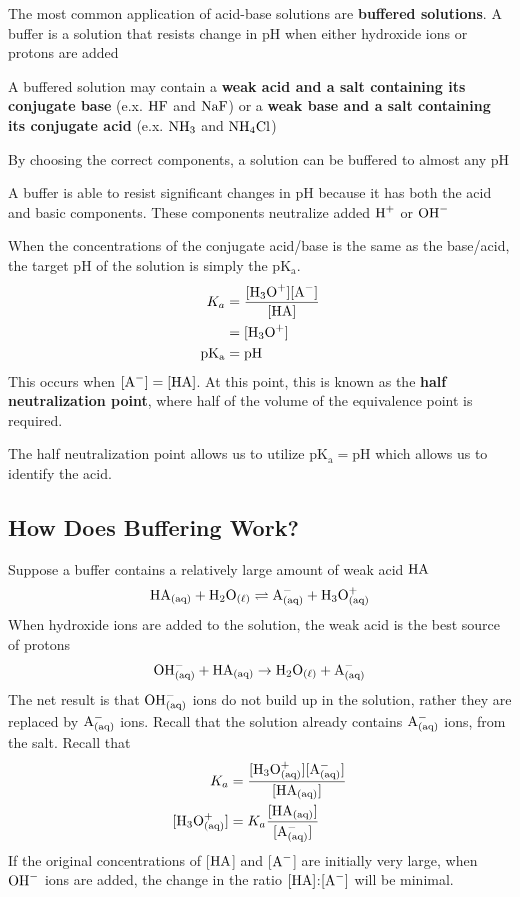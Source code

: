 The most common application of acid-base solutions are \textbf{buffered solutions}. A buffer
is a solution that resists change in pH when either hydroxide ions or protons are added
\begin{bulleted-list}
    \item A buffered solution may contain a \textbf{weak acid and a salt containing its conjugate
        base} (e.x. $\ch{HF}$ and $\ch{NaF}$) or a \textbf{weak base and a salt containing its 
        conjugate acid} (e.x. $\ch{NH3}$ and $\ch{NH4Cl}$)
    \item By choosing the correct components, a solution can be buffered to almost any pH
    \item A buffer is able to resist significant changes in pH because it has both
        the acid and basic components. These components neutralize added $\ch{H^+}$ or $\ch{OH^-}$
\end{bulleted-list}

When the concentrations of the conjugate acid/base is the same as the base/acid, the target pH
of the solution is simply the $\mathrm{pK_a}$. 
\begin{align*}
    K_a&=\frac{[\ch{H3O^+}][\ch{A^-}]}{[\ch{HA}]}\\
       &=[\ch{H3O^+}]\\
    \mathrm{pK_a}&=\mathrm{pH}
\end{align*}
This occurs when $[\ch{A^-}]=[\ch{HA}]$. At this point, this is known as the \textbf{half neutralization
point}, where half of the volume of the equivalence point is required.

\begin{important}
    The half neutralization point allows us to utilize $\mathrm{pK_a}=\mathrm{pH}$ which allows us to
    identify the acid.
\end{important}

\subsection{How Does Buffering Work?}
Suppose a buffer contains a relatively large amount of weak acid $\ch{HA}$
\[
    \ch{HA_{(aq)}}+\ch{H2O_{(\ell)}}\rightleftharpoons \ch{A^-_{(aq)}}+\ch{H3O^+_{(aq)}}
\]
When hydroxide ions are added to the solution, the weak acid is the best source of protons
\[
    \ch{OH^-_{(aq)}}+\ch{HA_{(aq)}}\to \ch{H2O_{(\ell)}}+\ch{A^-_{(aq)}}
\]
The net result is that $\ch{OH^-_{(aq)}}$ ions do not build up in the solution, rather they are
replaced by $\ch{A^-_{(aq)}}$ ions. Recall that the solution already contains $\ch{A^-_{(aq)}}$
ions, from the salt. Recall that
\begin{align*}
    K_a&=\frac{[\ch{H3O^+_{(aq)}}][\ch{A^-_{(aq)}}]}{[\ch{HA_{(aq)}}]}\\
    [\ch{H3O^+_{(aq)}}]&=K_a\frac{[\ch{HA_{(aq)}}]}{[\ch{A^-_{(aq)}}]}
\end{align*}
If the original concentrations of [$\ch{HA}$] and [$\ch{A-}$] are initially very large, when
$\ch{OH^-}$ ions are added, the change in the ratio $[\ch{HA}]$:$[\ch{A^-}]$ will be minimal. 
